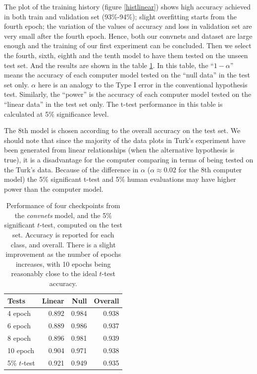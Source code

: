\documentclass[12pt]{article}
\begin{document}
The plot of the training history (figure \ref{histlinear}) shows high
accuracy achieved in both train and validation set (93\%-94\%); slight
overfitting starts from the fourth epoch; the variation of the values of
accuracy and loss in validation set are very small after the fourth
epoch. Hence, both our convnets and dataset are large enough and the
training of our first experiment can be concluded. Then we select the
fourth, sixth, eighth and the tenth model to have them tested on the
unseen test set. And the results are shown in the table
\ref{checkpoints}. In this table, the ``\(1-\alpha\)'' means the
accuracy of each computer model tested on the ``null data'' in the test
set only. \(\alpha\) here is an analogy to the Type I error in the
conventional hypothesis test. Similarly, the ``power'' is the accuracy
of each computer model tested on the ``linear data'' in the test set
only. The t-test performance in this table is calculated at 5\%
significance level.

The 8th model is chosen according to the overall accuracy on the test
set. We should note that since the majority of the data plots in Turk's
experiment have been generated from linear relationships (when the
alternative hypothesis is true), it is a disadvantage for the computer
comparing in terms of being tested on the Turk's data. Because of the
difference in \(\alpha\) (\(\alpha \approx 0.02\) for the 8th computer
model) the 5\% significant t-test and 5\% human evaluations may have
higher power than the computer model.

\begin{table}[ht]
\begin{center}
\begin{tabular}{|l|rrr|}\hline
Tests & Linear & Null & Overall \\\hline
4 epoch & 0.892 & 0.984 &  0.938 \\   
6 epoch & 0.889 & 0.986 & 0.937 \\
8 epoch & 0.896 & 0.981 & 0.939 \\
10 epoch & 0.904 & 0.971 & 0.938 \\
5\% $t$-test & 0.921 & 0.949 & 0.935\\\hline
\end{tabular}
\end{center}
\caption{Performance of four checkpoints from the {\em convnets} model, and the 5\% significant $t$-test, computed on the test set. Accuracy is reported for each class, and overall. There is a slight improvement as the number of epochs increases, with 10 epochs being reasonably close to the ideal $t$-test accuracy.}
\label{checkpoints}
\end{table}
\end{document}
